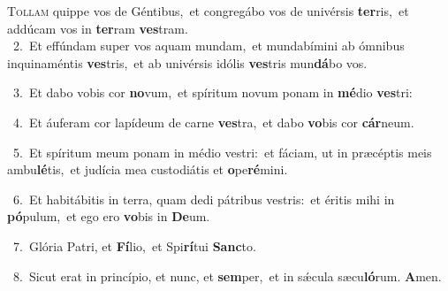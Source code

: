 \lettrine{\initial\textcolor{\initialcolor}{T}}{ollam} quippe vos de Géntibus,~\dagger et congregábo vos de univérsis \textbf{ter}\-ris,~\star et addúcam vos in \textbf{ter}\-ram \textbf{ves}\-tram.\\
{\numbfont\textcolor{\numbcolor}{~2.}}~Et effúndam super vos aquam mundam,~\dagger et mundabímini ab ómnibus inquinaméntis \textbf{ves}\-tris,~\star et ab univérsis idólis \textbf{ves}\-tris mun\-\textbf{dá}\-bo vos.\par
{\numbfont\textcolor{\numbcolor}{~3.}}~Et dabo vobis cor \textbf{no}\-vum,~\star et spíritum novum ponam in \textbf{mé}\-dio \textbf{ves}\-tri:\par
{\numbfont\textcolor{\numbcolor}{~4.}}~Et áuferam cor lapídeum de carne \textbf{ves}\-tra,~\star et dabo \textbf{vo}\-bis cor \textbf{cár}\-neum.\par
{\numbfont\textcolor{\numbcolor}{~5.}}~Et spíritum meum ponam in médio vestri:~\dagger et fáciam, ut in præcéptis meis ambu\-\textbf{lé}\-tis,~\star et judícia mea custodiátis et \textbf{o}\-pe\-\textbf{ré}\-mini.\par
{\numbfont\textcolor{\numbcolor}{~6.}}~Et habitábitis in terra, quam dedi pátribus vestris:~\dagger et éritis mihi in \textbf{pó}\-pulum,~\star et ego ero \textbf{vo}\-bis in \textbf{De}\-um.\par
{\numbfont\textcolor{\numbcolor}{~7.}}~Glória Patri, et \textbf{Fí}\-lio,~\star et Spi\-\textbf{rí}\-tui \textbf{Sanc}\-to.\par
{\numbfont\textcolor{\numbcolor}{~8.}}~Sicut erat in princípio, et nunc, et \textbf{sem}\-per,~\star et in sǽcula sæcu\-\textbf{ló}\-rum. \textbf{A}\-men.\par
